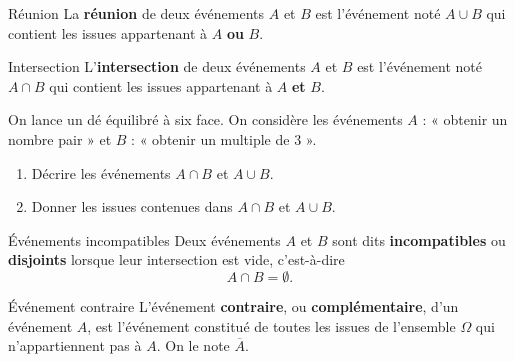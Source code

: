 \documentclass[11pt]{article}
\begin{document}
\begin{defi}{Réunion}
  La \textbf{réunion} de deux événements $A$ et $B$ est l'événement noté $A\cup
  B$ qui contient les issues appartenant à $A$ \textbf{ou} $B$.
\end{defi}

\begin{defi}{Intersection}
  L'\textbf{intersection} de deux événements $A$ et $B$ est l'événement noté
  $A\cap B$ qui contient les issues appartenant à $A$ \textbf{et} $B$.
\end{defi}

\begin{app}
  On lance un dé équilibré à six face. On considère les événements $A$ : «
  obtenir un nombre pair » et $B$ : « obtenir un multiple de $3$ ».
  \begin{enumerate}
    \item Décrire les événements $A\cap B$ et $A\cup B$.
    \item Donner les issues contenues dans $A\cap B$ et $A\cup B$.
  \end{enumerate}
\end{app}

\begin{defi}{Événements incompatibles}
  Deux événements $A$ et $B$ sont dits \textbf{incompatibles} ou
  \textbf{disjoints} lorsque leur intersection est vide, c'est-à-dire
  \[
    A\cap B = \emptyset.
  \]
\end{defi}

\begin{defi}{Événement contraire}
  L'événement \textbf{contraire}, ou \textbf{complémentaire}, d'un événement
  $A$, est l'événement constitué de toutes les issues de l'ensemble $\Omega$ qui
  n'appartiennent pas à $A$. On le note $\overline A$.
\end{defi}
\end{document}
